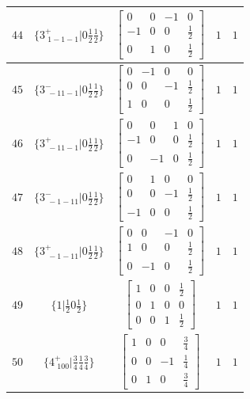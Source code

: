 \documentclass[fleqn,8pt]{jsarticle}
\begin{document}
\begin{longtable}{ccccc}
$ 44 $ & $ \{3^{+}_{\,\,1-1-1}|0 \frac{1}{2} \frac{1}{2}\} $ & $ \begin{bmatrix} 0 & 0 & -1 & 0 \\ -1 & 0 & 0 & \frac{1}{2} \\ 0 & 1 & 0 & \frac{1}{2} \end{bmatrix} $ & $ 1 $ & $ 1 $ \\ \hline
$ 45 $ & $ \{3^{-}_{\,\,-11-1}|0 \frac{1}{2} \frac{1}{2}\} $ & $ \begin{bmatrix} 0 & -1 & 0 & 0 \\ 0 & 0 & -1 & \frac{1}{2} \\ 1 & 0 & 0 & \frac{1}{2} \end{bmatrix} $ & $ 1 $ & $ 1 $ \\ \hline
$ 46 $ & $ \{3^{+}_{\,\,-11-1}|0 \frac{1}{2} \frac{1}{2}\} $ & $ \begin{bmatrix} 0 & 0 & 1 & 0 \\ -1 & 0 & 0 & \frac{1}{2} \\ 0 & -1 & 0 & \frac{1}{2} \end{bmatrix} $ & $ 1 $ & $ 1 $ \\ \hline
$ 47 $ & $ \{3^{-}_{\,\,-1-11}|0 \frac{1}{2} \frac{1}{2}\} $ & $ \begin{bmatrix} 0 & 1 & 0 & 0 \\ 0 & 0 & -1 & \frac{1}{2} \\ -1 & 0 & 0 & \frac{1}{2} \end{bmatrix} $ & $ 1 $ & $ 1 $ \\ \hline
$ 48 $ & $ \{3^{+}_{\,\,-1-11}|0 \frac{1}{2} \frac{1}{2}\} $ & $ \begin{bmatrix} 0 & 0 & -1 & 0 \\ 1 & 0 & 0 & \frac{1}{2} \\ 0 & -1 & 0 & \frac{1}{2} \end{bmatrix} $ & $ 1 $ & $ 1 $ \\ \hline
$ 49 $ & $ \{1|\frac{1}{2} 0 \frac{1}{2}\} $ & $ \begin{bmatrix} 1 & 0 & 0 & \frac{1}{2} \\ 0 & 1 & 0 & 0 \\ 0 & 0 & 1 & \frac{1}{2} \end{bmatrix} $ & $ 1 $ & $ 1 $ \\ \hline
$ 50 $ & $ \{4^{+}_{\,\,100}|\frac{3}{4} \frac{1}{4} \frac{3}{4}\} $ & $ \begin{bmatrix} 1 & 0 & 0 & \frac{3}{4} \\ 0 & 0 & -1 & \frac{1}{4} \\ 0 & 1 & 0 & \frac{3}{4} \end{bmatrix} $ & $ 1 $ & $ 1 $ \\ \hline

\end{longtable}
\end{document}
